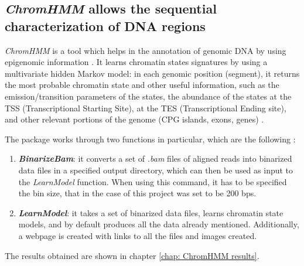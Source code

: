 \subsection{\textit{ChromHMM} allows the sequential characterization of DNA regions}
\textit{ChromHMM} is a tool which helps in the annotation of genomic DNA by using epigenomic information
\cite{ernstChromatinstateDiscoveryGenome2017}.
It learns chromatin states signatures by using a multivariate hidden Markov model: in each genomic position (segment), it returns the most probable chromatin state and other useful information, such as the emission/transition parameters of the states, the abundance of the states at the TSS (Transcriptional Starting Site), at the TES (Transcriptional Ending site), and other relevant portions of the genome (CPG islands, exons, genes)
\cite{chilledhousevibesLearningChromatinStates2015,ernstChromatinstateDiscoveryGenome2017}. 

The package works through two functions in particular, which are the following
\cite{ernstChromatinstateDiscoveryGenome2017}:
\begin{enumerate}
    \item \textbf{\textit{BinarizeBam}}: it converts a set of \textit{.bam} files of aligned reads into binarized data files in a specified output directory, which can then be used as input to the \textit{LearnModel} function. When using this command, it has to be specified the bin size, that in the case of this project was set to be 200 bps.
    \item  \textbf{\textit{LearnModel}}: it takes a set of binarized data files, learns chromatin state models, and by default produces all the data already mentioned. Additionally, a webpage is created with links to all the files and images created.
\end{enumerate}

The results obtained are shown in chapter \ref{chap: ChromHMM results}.
